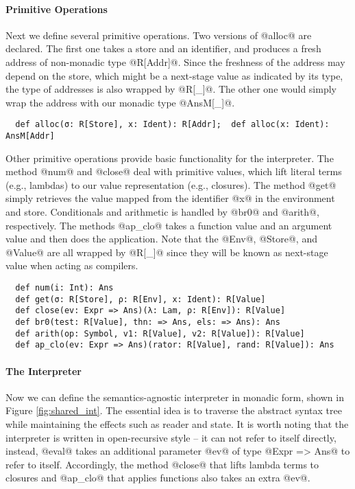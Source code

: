 \paragraph{Primitive Operations} Next we define several primitive operations.
Two versions of @alloc@ are declared. The first one takes a store and an
identifier, and produces a fresh address of non-monadic type @R[Addr]@. Since
the freshness of the address may depend on the store, which might be a
next-stage value as indicated by its type, the type of addresses is also wrapped
by @R[_]@. The other one would simply wrap the address with our monadic type
@AnsM[_]@.
\begin{lstlisting}
  def alloc(σ: R[Store], x: Ident): R[Addr];  def alloc(x: Ident): AnsM[Addr]
\end{lstlisting}

Other primitive operations provide basic functionality for the interpreter.
The method @num@ and @close@ deal with primitive values, which lift literal
terms (e.g., lambdas) to our value representation (e.g., closures).
The method @get@ simply retrieves the value mapped from the identifier @x@ in
the environment and store. Conditionals and arithmetic is handled by @br0@
and @arith@, respectively. The methods @ap_clo@ takes a function value and an
argument value and then does the application. Note that the @Env@, @Store@, and
@Value@ are all wrapped by @R[_]@ since they will be known as next-stage value
when acting as compilers.


\begin{lstlisting}
  def num(i: Int): Ans
  def get(σ: R[Store], ρ: R[Env], x: Ident): R[Value]
  def close(ev: Expr => Ans)(λ: Lam, ρ: R[Env]): R[Value]
  def br0(test: R[Value], thn: => Ans, els: => Ans): Ans
  def arith(op: Symbol, v1: R[Value], v2: R[Value]): R[Value]
  def ap_clo(ev: Expr => Ans)(rator: R[Value], rand: R[Value]): Ans
\end{lstlisting}

\paragraph{The Interpreter} Now we can define the semantics-agnostic interpreter
in monadic form, shown in Figure \ref{fig:shared_int}.
The essential idea is to traverse the abstract syntax tree while maintaining the
effects such as reader and state.
It is worth noting that the interpreter is written in open-recursive style -- it
can not refer to itself directly, instead, @eval@ takes an additional parameter
@ev@ of type @Expr => Ans@ to refer to itself. Accordingly, the method @close@
that lifts lambda terms to closures and @ap_clo@ that applies functions also
takes an extra @ev@.

